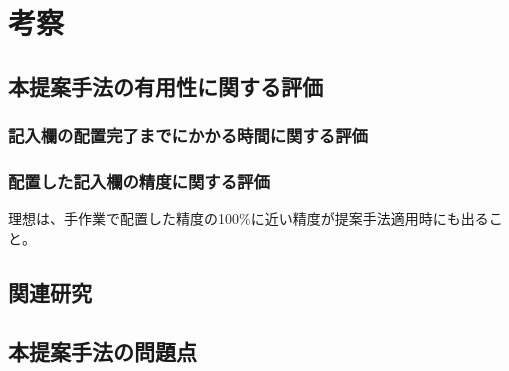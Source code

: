 \chapter{考察}\label{cha:Discussion}



\section{本提案手法の有用性に関する評価}\label{sec:evalue_usefulness}

\subsection{記入欄の配置完了までにかかる時間に関する評価}\label{subsec:evalue_required_time}

\subsection{配置した記入欄の精度に関する評価}\label{subsec:evalue_accuracy}
理想は、手作業で配置した精度の100\%に近い精度が提案手法適用時にも出ること。



\section{関連研究}\label{sec:relation_research}



\section{本提案手法の問題点}\label{sec:AWSEL_problems}